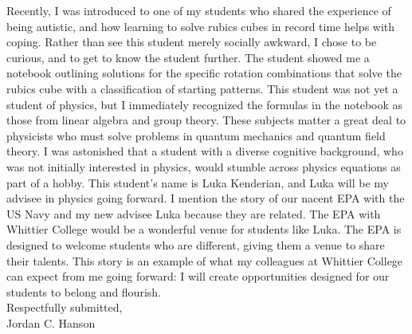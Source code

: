 \documentclass[../main.tex]{subfiles}
\begin{document}
Recently, I was introduced to one of my students who shared the experience of being autistic, and how learning to solve rubics cubes in record time helps with coping.  Rather than see this student merely socially awkward, I chose to be curious, and to get to know the student further.  The student showed me a notebook outlining solutions for the specific rotation combinations that solve the rubics cube with a classification of starting patterns.  This student was not yet a student of physics, but I immediately recognized the formulas in the notebook as those from linear algebra and group theory.  These subjects matter a great deal to physicists who must solve problems in quantum mechanics and quantum field theory.  I was astonished that a student with a diverse cognitive background, who was not initially interested in physics, would stumble across physics equations as part of a hobby.  This student's name is Luka Kenderian, and Luka will be my advisee in physics going forward.  I mention the story of our nacent EPA with the US Navy and my new advisee Luka because they are related.  The EPA with Whittier College would be a wonderful venue for students like Luka.  The EPA is designed to welcome students who are different, giving them a venue to share their talents.  This story is an example of what my colleagues at Whittier College can expect from me going forward: I will create opportunities designed for our students to belong and flourish.
\\ \vspace{0.15cm}
Respectfully submitted,
\\ \vspace{0.15cm}
Jordan C. Hanson
\end{document}
